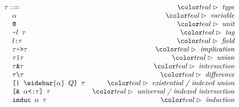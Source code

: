 \documentclass[sigplan,screen,review]{acmart}
\begin{document}
\begin{figure*}[h]
\[
\begin{array}[t]{l r}
\tau ::= &\C{type}
  \\
  \I \code{$\alpha$}  &\C{variable}
  \\
  \I \code{@} &\C{unit}
  \\
  \I \code{\textasciitilde{}$l$ $\tau$} &\C{tag}
  \\
  \I \code{$l$:$\tau$} &\C{field}
  \\
  \I \code{$\tau$->$\tau$} &\C{implication}
  \\
  \I \code{$\tau$|$\tau$} &\C{union}
  \\
  \I \code{$\tau$\&$\tau$} &\C{intersection}
  \\
  \I \code{$\tau$\textbackslash$\tau$} &\C{difference}
  \\
  \I \code{[| $\widebar{\alpha}$ $Q$] $\tau$} &\C{existential / indexed union}
  \\
  \I \code{[\& $\alpha$<:$\tau$] $\tau$} &\C{universal / indexed intersection}
  \\
  \I \code{induc $\alpha$ $\tau$} &\C{induction}
  \\

\end{array}\]
\end{figure*}
\end{document}
